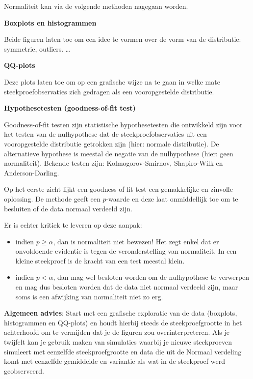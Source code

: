 \documentclass[
  12pt,dutch,coursenotes]{book}
\providecommand{\tightlist}{%
  \setlength{\itemsep}{0pt}\setlength{\parskip}{0pt}}
\begin{document}
Normaliteit kan via de volgende methoden nagegaan worden.

\textbf{Boxplots en histogrammen}

Beide figuren laten toe om een idee te vormen over de vorm van de distributie: symmetrie, outliers. \ldots

\textbf{QQ-plots}

Deze plots laten toe om op een grafische wijze na te gaan in welke mate steekproefobservaties zich gedragen als een vooropgestelde distributie.

\textbf{Hypothesetesten (goodness-of-fit test)}

Goodness-of-fit testen zijn statistische hypothesetesten die ontwikkeld zijn voor het testen van de nulhypothese dat de steekproefobservaties uit een vooropgestelde distributie getrokken zijn (hier: normale distributie). De alternatieve hypothese is meestal de negatie van de nulhypothese (hier: geen normaliteit). Bekende testen zijn: Kolmogorov-Smirnov, Shapiro-Wilk en Anderson-Darling.

Op het eerste zicht lijkt een goodness-of-fit test een gemakkelijke en zinvolle oplossing. De methode geeft een \(p\)-waarde en deze laat onmiddellijk toe om te besluiten of de data normaal verdeeld zijn.

Er is echter kritiek te leveren op deze aanpak:

\begin{itemize}
\tightlist
\item
  indien \(p\geq \alpha\), dan is normaliteit niet bewezen! Het zegt enkel dat er onvoldoende evidentie is tegen de veronderstelling van normaliteit. In een kleine steekproef is de kracht van een test meestal klein.
\item
  indien \(p<\alpha\), dan mag wel besloten worden om de nulhypothese te verwerpen en mag dus besloten worden dat de data niet normaal verdeeld zijn, maar soms is een afwijking van normaliteit niet zo erg.
\end{itemize}

\textbf{Algemeen advies}:
Start met een grafische exploratie van de data (boxplots, histogrammen en QQ-plots) en houdt hierbij steeds de steekproefgrootte in het achterhoofd om te vermijden dat je de figuren zou overinterpreteren. Als je twijfelt kan je gebruik maken van simulaties waarbij je nieuwe steekproeven simuleert met eenzelfde steekproefgrootte en data die uit de Normaal verdeling komt met eenzelfde gemiddelde en variantie als wat in de steekproef werd geobserveerd.
\end{document}
